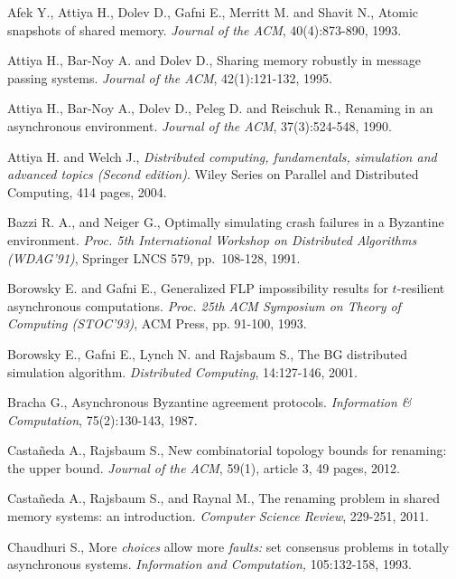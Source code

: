 \documentclass[11pt,letterpaper]{article}
\begin{document}
\begin{thebibliography}{99}
\footnotesize{
\setlength{\baselineskip}{1.03\baselineskip}

Afek Y., Attiya H., Dolev D., Gafni E., Merritt M. and Shavit N., 
Atomic snapshots of shared memory. 
{\em Journal of the  ACM}, 40(4):873-890, 1993.


Attiya H., Bar-Noy A. and Dolev D.,
 Sharing memory robustly in  message passing systems.
{\it Journal of the ACM}, 42(1):121-132, 1995.


Attiya H., Bar-Noy A., Dolev D., Peleg D. and Reischuk R.,
Renaming in an asynchronous environment.
{\it Journal of the ACM}, 37(3):524-548, 1990.

Attiya H. and Welch J.,
{\it Distributed computing, fundamentals, simulation and advanced topics
(Second edition)}.
Wiley Series on Parallel and Distributed Computing, 414 pages, 2004.

Bazzi R. A., and Neiger G.,
Optimally simulating crash failures in a Byzantine environment.
{\it Proc.  5th International Workshop on Distributed Algorithms (WDAG'91)},
Springer LNCS 579, pp.~108-128, 1991. 


Borowsky E. and Gafni E.,
Generalized FLP impossibility results for $t$-resilient asynchronous
computations.
{\em Proc. 25th ACM  Symposium on Theory of Computing (STOC'93)},
ACM Press, pp. 91-100, 1993.

 Borowsky E.,  Gafni E., Lynch N.  and  Rajsbaum S.,
The BG distributed simulation algorithm.
{\em Distributed  Computing}, 14:127-146, 2001.

Bracha G.,
Asynchronous Byzantine agreement protocols.
{\it Information \& Computation}, 75(2):130-143, 1987.


Casta\~neda A., Rajsbaum S.,
New combinatorial topology bounds for renaming: the upper bound.
{\it Journal of the  ACM}, 59(1), article 3, 49 pages, 2012.


Casta\~neda A., Rajsbaum S., and Raynal M.,
The renaming problem in shared memory systems: an introduction.
{\it Computer Science Review}, 229-251, 2011.

Chaudhuri S.,
More {\em choices} allow more {\em faults:} set consensus
problems in totally asynchronous systems.
{\em Information and Computation,} 105:132-158, 1993.



}
\end{thebibliography}
\end{document}
